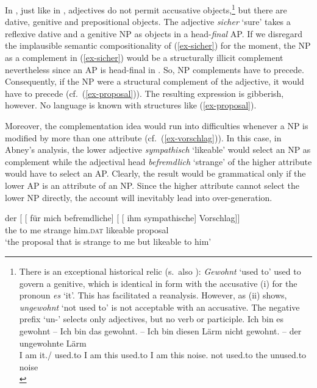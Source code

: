 \documentclass[output=paper
  ,nobabel
  ,uniformtopskip %
]{langscibook}
\begin{document}
In , just like in , adjectives do not permit accusative objects,\footnote{There is an
  exceptional historical relic (s.\ also \citealt[272]{Mueller99a}): \emph{Gewohnt} `used to' used to govern a genitive, which is identical in form with the accusative (i) for the pronoun \emph{es} `it'. This has facilitated a reanalysis. However, as (ii) shows, \emph{ungewohnt} `not used to' is not acceptable with an accusative. The negative prefix  `un-' selects only adjectives, but no verb or participle.
\ea
\gll Ich bin es             gewohnt – Ich bin das gewohnt. –  Ich bin diesen Lärm         nicht gewohnt. – der ungewohnte Lärm \\
     I   am  it.\GEN/\ACC{} used.to  {} I am this used.to  {} I   am  this   noise.\ACC{} not   used.to  {} the unused.to noise\\
\z
{}
\zlast
} but there are dative, genitive and prepositional objects. The adjective \emph{sicher} `sure' takes a reflexive dative and a genitive NP as objects in a head-\emph{final} AP. If we disregard the implausible semantic compositionality of (\ref{ex-sicher}) for the moment, the NP as a complement in (\ref{ex-sicher}) would be a structurally illicit complement nevertheless since an AP is head-final in . So, NP complements have to precede. Consequently, if the NP were a structural complement of the adjective, it would have to precede (cf.\ (\ref{ex-proposal})). The resulting expression is gibberish, however. No language is known with structures like (\ref{ex-proposal}).

Moreover, the complementation idea would run into difficulties whenever a NP is modified by more than one attribute (cf.\ (\ref{ex-vorschlag})). In this case, in Abney's analysis, the lower adjective \emph{sympathisch} `likeable' would select an NP as complement while the adjectival head \emph{befremdlich} `strange' of the higher attribute would have to select an AP. Clearly, the result would be grammatical only if the lower AP is an attribute of an NP. Since the higher attribute cannot select the lower NP directly, the account will inevitably lead into over-generation.

\ea\label{ex-vorschlag}
\gll  der [ [ für mich befremdliche] [ [ ihm              sympathische] Vorschlag]]\\
      the {}        {}        to  me   strange       {}        {}        him\textsc{.dat} likeable      proposal\\
\glt `the proposal that is strange to me but likeable to him'
\z
\end{document}
